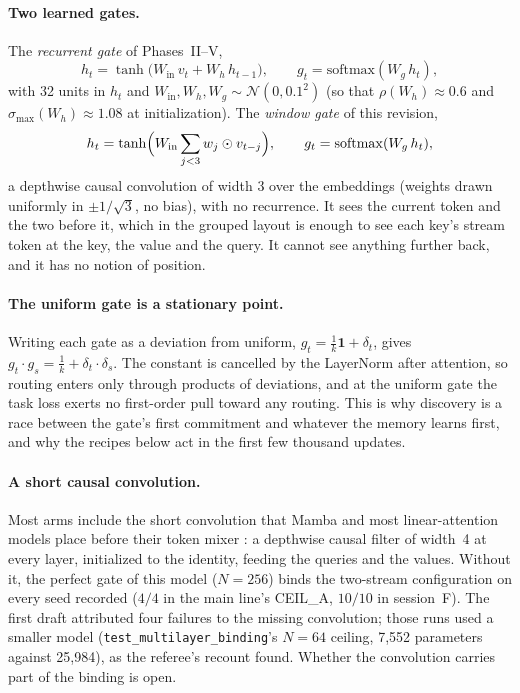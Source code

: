 \documentclass[11pt]{article}
\newcommand{\arm}[1]{\textsf{#1}}
\begin{document}
\paragraph{Two learned gates.} The \emph{recurrent gate} of Phases~II--V,
\begin{equation}
h_t = \tanh\bigl(W_{\mathrm{in}}\,v_t + W_h\,h_{t-1}\bigr), \qquad g_t = \mathrm{softmax}(W_g\,h_t),
\label{eq:gate}
\end{equation}
with 32 units in $h_t$ and $W_{\mathrm{in}}, W_h, W_g \sim \mathcal{N}(0, 0.1^2)$ (so that $\rho(W_h) \approx 0.6$ and $\sigma_{\max}(W_h) \approx 1.08$ at initialization). The \emph{window gate} of this revision,
\begin{equation}
h_t = \tanh\Bigl(W_{\mathrm{in}} \sum_{j<3} w_j \odot v_{t-j}\Bigr), \qquad g_t = \mathrm{softmax}(W_g\,h_t),
\label{eq:window}
\end{equation}
a depthwise causal convolution of width 3 over the embeddings (weights drawn uniformly in $\pm 1/\sqrt{3}$, no bias), with no recurrence. It sees the current token and the two before it, which in the grouped layout is enough to see each key's stream token at the key, the value and the query. It cannot see anything further back, and it has no notion of position.

\paragraph{The uniform gate is a stationary point.} Writing each gate as a deviation from uniform, $g_t = \tfrac{1}{k}\mathbf{1} + \delta_t$, gives $g_t \cdot g_s = \tfrac{1}{k} + \delta_t \cdot \delta_s$. The constant is cancelled by the LayerNorm after attention, so routing enters only through products of deviations, and at the uniform gate the task loss exerts no first-order pull toward any routing. This is why discovery is a race between the gate's first commitment and whatever the memory learns first, and why the recipes below act in the first few thousand updates.

\paragraph{A short causal convolution.} Most arms include the short convolution that Mamba and most linear-attention models place before their token mixer \cite{mamba}: a depthwise causal filter of width~4 at every layer, initialized to the identity, feeding the queries and the values. Without it, the perfect gate of this model ($N = 256$) binds the two-stream configuration on every seed recorded ($4/4$ in the main line's \arm{CEIL\_A}, $10/10$ in session~F). The first draft attributed four failures to the missing convolution; those runs used a smaller model (\texttt{test\_multilayer\_binding}'s $N = 64$ ceiling, 7{,}552 parameters against 25{,}984), as the referee's recount found. Whether the convolution carries part of the binding is open.
\end{document}
